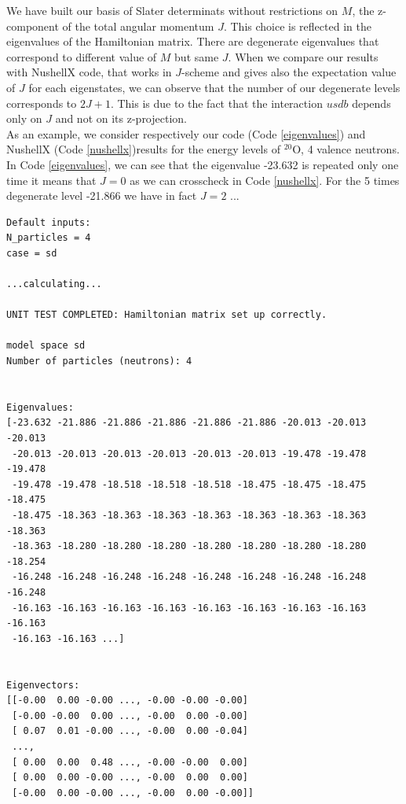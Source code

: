\documentclass[twoside]{article}
\begin{document}
We have built our basis of Slater determinats without restrictions on $M$, the z-component of the total angular momentum $J$. This choice is reflected in the eigenvalues of the Hamiltonian matrix. There are degenerate eigenvalues that correspond to different value of $M$ but same $J$. When we compare our results with NushellX code, that works in $J$-scheme and gives also the expectation value of $J$ for each eigenstates, we can observe that the number of our degenerate levels corresponds to $2J+1$. This is due to the fact that the interaction $usdb$\cite{Brown 2006} depends only on $J$ and not on its z-projection.\\
As an example, we consider respectively our code (Code \ref{eigenvalues}) and NushellX (Code \ref{nushellx})results for the energy levels of $^{20}$O, 4 valence neutrons. In Code \ref{eigenvalues}, we can see that the eigenvalue -23.632 is repeated only one time it means that $J=0$ as we can crosscheck in Code \ref{nushellx}. For the 5 times degenerate level -21.866 we have in fact $J=2$ ...

\begin{lstlisting}[label=eigenvalues,caption= example of the output from \texttt{main.py} when it is run with default inputs. To be noticed the degenerate eigenvalues.]
Default inputs: 
N_particles = 4 
case = sd 

...calculating...

UNIT TEST COMPLETED: Hamiltonian matrix set up correctly.

model space sd
Number of particles (neutrons): 4


Eigenvalues:
[-23.632 -21.886 -21.886 -21.886 -21.886 -21.886 -20.013 -20.013 -20.013
 -20.013 -20.013 -20.013 -20.013 -20.013 -20.013 -19.478 -19.478 -19.478
 -19.478 -19.478 -18.518 -18.518 -18.518 -18.475 -18.475 -18.475 -18.475
 -18.475 -18.363 -18.363 -18.363 -18.363 -18.363 -18.363 -18.363 -18.363
 -18.363 -18.280 -18.280 -18.280 -18.280 -18.280 -18.280 -18.280 -18.254
 -16.248 -16.248 -16.248 -16.248 -16.248 -16.248 -16.248 -16.248 -16.248
 -16.163 -16.163 -16.163 -16.163 -16.163 -16.163 -16.163 -16.163 -16.163
 -16.163 -16.163 ...]


Eigenvectors:
[[-0.00  0.00 -0.00 ..., -0.00 -0.00 -0.00]
 [-0.00 -0.00  0.00 ..., -0.00  0.00 -0.00]
 [ 0.07  0.01 -0.00 ..., -0.00  0.00 -0.04]
 ..., 
 [ 0.00  0.00  0.48 ..., -0.00 -0.00  0.00]
 [ 0.00  0.00 -0.00 ..., -0.00  0.00  0.00]
 [-0.00  0.00 -0.00 ..., -0.00  0.00 -0.00]]
\end{lstlisting}
\end{document}
